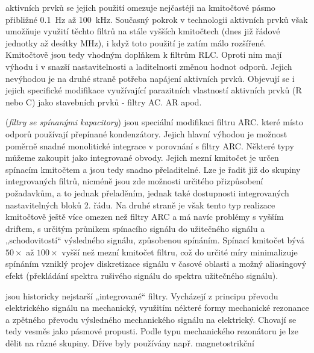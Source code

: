\begin{description}[noitemsep]
              aktivních prvků se jejich použití omezuje nejčastéji na kmitočtové pásmo přibližné
              \SI{0.1}{\hertz} až \SI{100}{\kilo\hertz}. Současný pokrok v technologii aktivních
              prvků však umožňuje využití těchto filtrů na stále vyšších kmitočtech (dnes již
              řádové jednotky až desítky \si{\mega\hertz}), i když toto použití je zatím málo
              rozšířené. Kmitočtově jsou tedy vhodným doplňkem k filtrům RLC. Oproti nim mají
              výhodu i v snazší nastavitelnosti a laditelnosti změnou hodnot odporů. Jejich
              nevýhodou je na druhé straně potřeba napájení aktivních prvků. Objevují se i jejich
              specifické modifikace využívající parazitních vlastností aktivních prvků (R nebo C)
              jako stavebních prvků - filtry AC. AR apod.
        \item[\textbf{Filtry ASC}] (\emph{filtry se spínanými kapacitory}) jsou speciální
              modifikaci filtru ARC. které místo odporů používají přepínané kondenzátory. Jejich
              hlavní výhodou je možnost poměrně snadné monolitické integrace v porovnání s filtry
              ARC. Některé typy můžeme zakoupit jako integrované obvody. Jejich mezní kmitočet je
              určen spínacím kmitočtem a jsou tedy snadno přeladitelné. Lze je řadit již do
              skupiny integrovaných filtrů, nicméně jsou zde možnosti určitého přizpůsobení
              požadavkům, a to jednak přeladěním, jednak také dostupnosti integrovaných
              nastavitelných bloků 2. řádu. Na druhé straně je však tento typ realizace kmitočtově
              ještě více omezen než filtry ARC a má navíc problémy s vyšším driftem, s určitým
              průnikem spínacího signálu do užitečného signálu a „schodovitostí“ výsledného
              signálu, způsobenou spínáním. Spínací kmitočet bývá \(\num{50}\times\) až
              \(\num{100}\times\) vyšší než mezní kmitočet filtru, což do určité míry minimalizuje
              spínáním vzniklý projev diskretizace signálu v časové oblasti a možný aliasingový
              efekt (překládání spektra rušivého signálu do spektra užitečného signálu).
        \item[\textbf{Elektromechanické filtry}] jsou historicky nejstarší „integrované“ filtry.
              Vycházejí z principu převodu elektrického signálu na mechanický, využitím nékteré
              formy mechanické rezonance a zpětného převodu výsledného mechanického signálu na
              elektrický. Chovají se tedy vesměs jako pásmové propusti. Podle typu mechanického
              rezonátoru je lze dělit na různé skupiny. Dříve byly používány např. magnetostrikční

\end{description}
